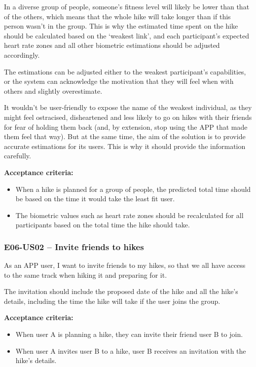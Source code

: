 In a diverse group of people, someone's fitness level will likely be lower than that of the others, which means that the whole hike will take longer than if this person wasn't in the group.
This is why the estimated time spent on the hike should be calculated based on the `weakest link', and each participant's expected heart rate zones and all other biometric estimations should be adjusted accordingly.

The estimations can be adjusted either to the weakest participant's capabilities, or the system can acknowledge the motivation that they will feel when with others and slightly overestimate.

It wouldn't be user-friendly to expose the name of the weakest individual, as they might feel ostracised, disheartened and less likely to go on hikes with their friends for fear of holding them back
(and, by extension, stop using the APP that made them feel that way).
But at the same time, the aim of the solution is to provide accurate estimations for its users.
This is why it should provide the information carefully.

\textbf{Acceptance criteria:}
\begin{itemize}
    \item When a hike is planned for a group of people, the predicted total time should be based on the time it would take the least fit user.
    \item The biometric values such as heart rate zones should be recalculated for all participants based on the total time the hike should take.
\end{itemize}


\subsubsection*{E06-US02 -- Invite friends to hikes}
As an APP user, I want to invite friends to my hikes, so that we all have access to the same track when hiking it and preparing for it.

The invitation should include the proposed date of the hike and all the hike's details, including the time the hike will take if the user joins the group.

\textbf{Acceptance criteria:}
\begin{itemize}
    \item When user A is planning a hike, they can invite their friend user B to join. 
    \item When user A invites user B to a hike, user B receives an invitation with the hike's details.
\end{itemize}

